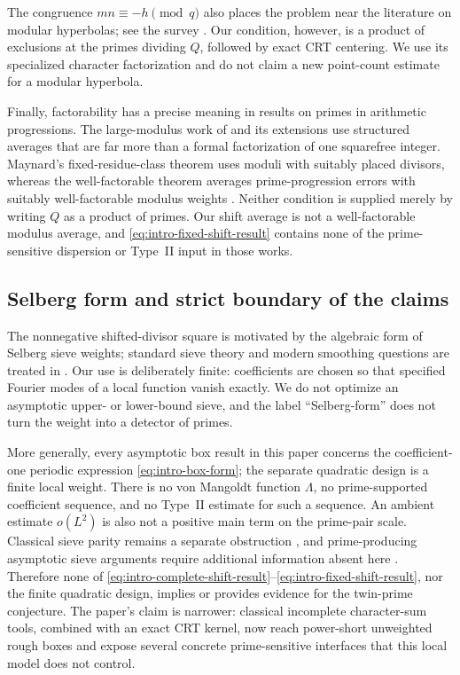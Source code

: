 The congruence $mn\equiv-h\pmod q$ also places the problem near the literature
on modular hyperbolas; see the survey \citep{Shparlinski2012}.  Our condition,
however, is a product of exclusions at the primes dividing $Q$, followed by
exact CRT centering.  We use its specialized character factorization and do
not claim a new point-count estimate for a modular hyperbola.

Finally, factorability has a precise meaning in results on primes in
arithmetic progressions.  The large-modulus work of
\citet{BombieriFriedlanderIwaniec1986} and its extensions use structured
averages that are far more than a formal factorization of one squarefree
integer.  Maynard's fixed-residue-class theorem uses moduli
with suitably placed divisors, whereas the well-factorable theorem averages
prime-progression errors with suitably well-factorable modulus weights
\citep{Maynard2025FixedResidue,Maynard2025WellFactorable}.  Neither condition
is supplied merely by writing $Q$ as a product of primes.  Our shift average
is not a well-factorable modulus average, and \eqref{eq:intro-fixed-shift-result}
contains none of the prime-sensitive dispersion or Type~II input in those
works.

\subsection{Selberg form and strict boundary of the claims}

The nonnegative shifted-divisor square is motivated by the algebraic form of
Selberg sieve weights; standard sieve theory and modern smoothing questions
are treated in \citep{FriedlanderIwaniec2010,GranvilleKoukoulopoulosMaynard2021}.
Our use is deliberately finite: coefficients are chosen so that specified
Fourier modes of a local function vanish exactly.  We do not optimize an
asymptotic upper- or lower-bound sieve, and the label ``Selberg-form'' does not
turn the weight into a detector of primes.

More generally, every asymptotic box result in this paper concerns the
coefficient-one periodic expression \eqref{eq:intro-box-form}; the separate
quadratic design is a finite local weight.  There is no von Mangoldt function
$\Lambda$, no prime-supported coefficient sequence, and no Type~II estimate
for such a sequence.  An ambient estimate $o(L^2)$ is also not a positive main term on
the prime-pair scale.  Classical sieve parity remains a separate obstruction
\citep{HeathBrown1982}, and prime-producing asymptotic sieve arguments require
additional information absent here \citep{FriedlanderIwaniec1998}.  Therefore
none of \eqref{eq:intro-complete-shift-result}--\eqref{eq:intro-fixed-shift-result},
nor the finite quadratic design, implies or provides evidence for the
twin-prime conjecture.  The paper's claim is narrower: classical incomplete
character-sum tools, combined with an exact CRT kernel, now reach power-short
unweighted rough boxes and expose several concrete prime-sensitive interfaces
that this local model does not control.
